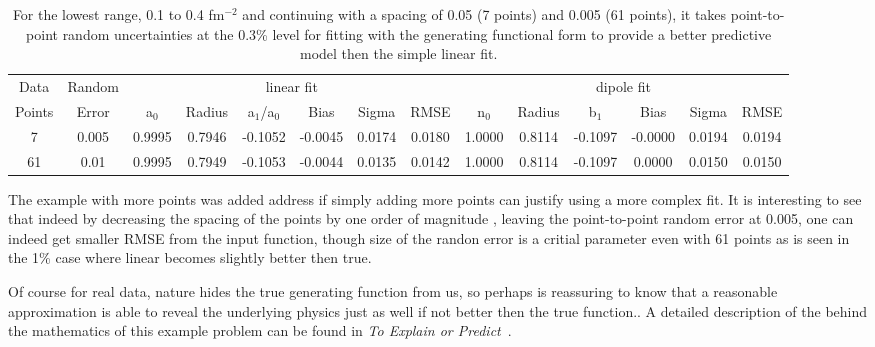 \documentclass[10pt,aps,prc,twocolumn]{revtex4-1}
\begin{document}
\begin{table}
\caption{For the lowest range, 0.1 to 0.4 fm$^{-2}$ and continuing with a spacing of 0.05 (7 points) and 0.005 (61 points), 
it takes point-to-point random uncertainties at the 0.3\% level for fitting with the generating
functional form to provide a better predictive model then the simple linear fit.}
\begin{tabular}{cc|cccccc|cccccc} \hline
Data   & Random   & \multicolumn{6}{c|}{linear fit}                       & \multicolumn{6}{c}{dipole fit}            \\ 
Points & Error    & a$_0$ & Radius&a$_1$/a$_0$&  Bias  & Sigma &  RMSE  & n$_0$ & Radius& b$_1$  &  Bias  & Sigma &  RMSE   \\  \hline
7      & 0.005    & 0.9995& 0.7946& -0.1052& -0.0045& 0.0174& 0.0180 & 1.0000& 0.8114& -0.1097& -0.0000& 0.0194& 0.0194  \\
61     & 0.01     & 0.9995& 0.7949& -0.1053& -0.0044& 0.0135& 0.0142 & 1.0000& 0.8114& -0.1097&  0.0000& 0.0150& 0.0150  \\ 
\end{tabular}
\label{simpleVSperfect}
\end{table}

The example with more points was added address if simply adding more points can justify using a more complex fit.
It is interesting to see that indeed by decreasing the spacing of the points
by one order of magnitude , leaving the point-to-point random error at 0.005, 
one can indeed get smaller RMSE from the input function, though size of the randon error is a critial parameter even
with 61 points as is seen in the 1\% case where linear becomes slightly better then true. 

Of course for real data, nature hides the true generating function from us, so perhaps is reassuring to know
that a reasonable approximation is able to reveal the underlying physics just as well if not better then the
true function..   A detailed description of the  behind the mathematics of this example problem can be 
found in {\it{To Explain or Predict}}~\cite{Shmueli:2010}.    
\end{document}
